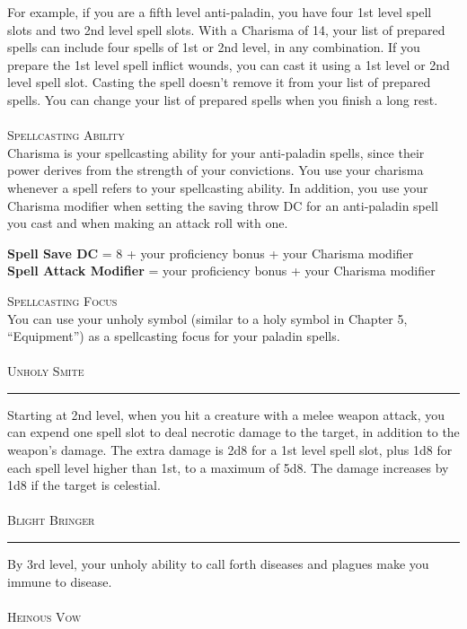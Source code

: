 \documentclass[22pt,a4paper]{article}
\newcommand{\HRule}[2]{\par
  \vspace*{\dimexpr-\parskip-\baselineskip+#2}
  \begingroup
  	\color{sepcol}
  	\noindent\rule{\linewidth}{#1}\par
  \endgroup  
  \vspace*{\dimexpr-\parskip-.5\baselineskip+#2}}
\begin{document}
\begin{multicols*}{2}
\indent For example, if you are a fifth level anti-paladin, you have four 1st level spell slots and two 2nd level spell slots. With a Charisma of 14, your list of prepared spells can include four spells of 1st or 2nd level, in any combination. If you prepare the 1st level spell inflict wounds, you can cast it using a 1st level or 2nd level spell slot. Casting the spell doesn’t remove it from your list of prepared spells.
\indent You can change your list of prepared spells when you finish a long rest.\\
\\
{\fontsize{12pt}{12pt}\textcolor{title}{\textsc{Spellcasting Ability}}}\\ 
Charisma is your spellcasting ability for your anti-paladin spells, since their power derives from the strength of your convictions. You use your charisma whenever a spell refers to your spellcasting ability. In addition, you use your Charisma modifier when setting the saving throw DC for an anti-paladin spell you cast and when making an attack roll with one. \\
\begin{center}
\textbf{Spell Save DC} = 8 + your proficiency bonus + your Charisma modifier\\
\textbf{Spell Attack Modifier} = your proficiency bonus + your Charisma modifier
\end{center}
{\fontsize{12pt}{12pt}\textcolor{title}{\textsc{Spellcasting Focus}}}\\
You can use your unholy symbol (similar to a holy symbol in Chapter 5, “Equipment”) as a spellcasting focus for your paladin spells. \\
\\
{\fontsize{14pt}{14pt}\textcolor{title}{\textsc{Unholy Smite}}}
\HRule{1pt}{8pt}
Starting at 2nd level, when you hit a creature with a melee weapon attack, you can expend one spell slot to deal necrotic damage to the target, in addition to the weapon’s damage. The extra damage is 2d8 for a 1st level spell slot, plus 1d8 for each spell level higher than 1st, to a maximum of 5d8. The damage increases by 1d8 if the target is celestial.\\
\\
{\fontsize{14pt}{14pt}\textcolor{title}{\textsc{Blight Bringer}}}
\HRule{1pt}{8pt}
By 3rd level, your unholy ability to call forth diseases and plagues make you immune to disease. \\
\\
{\fontsize{14pt}{14pt}\textcolor{title}{\textsc{Heinous Vow}}}

\end{multicols*}
\end{document}
